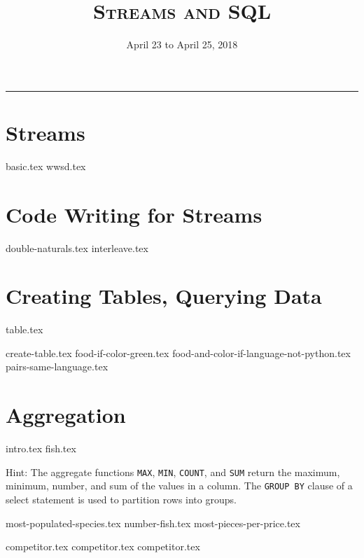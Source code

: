 \documentclass{exam}
\title{\textsc{Streams and SQL}}
\date{April 23 to April 25, 2018}
\begin{document}
\maketitle
\rule{\textwidth}{0.15em}
\fontsize{12}{15}\selectfont

\section{Streams}
\begin{questions}
{basic.tex}
\newpage
{wwsd.tex}
\end{questions}
\section{Code Writing for Streams}
\begin{questions}
{double-naturals.tex}
{interleave.tex}
\end{questions}

\newpage
\section{Creating Tables, Querying Data}
{table.tex}

\begin{questions}
{create-table.tex}
\newpage
{food-if-color-green.tex}
{food-and-color-if-language-not-python.tex}
{pairs-same-language.tex}
\end{questions}

\newpage
\section{Aggregation}
{intro.tex}
{fish.tex}

Hint: The aggregate functions \texttt{MAX}, \texttt{MIN}, \texttt{COUNT}, and \texttt{SUM} return the maximum, minimum, number, and sum of the values in a column. The  \texttt{GROUP BY} clause of a select statement is used to partition rows into groups.

\begin{questions}
{most-populated-species.tex}
{number-fish.tex}
{most-pieces-per-price.tex}

\newpage
{competitor.tex}
{competitor.tex}
{competitor.tex}
\end{questions}
\end{document}
